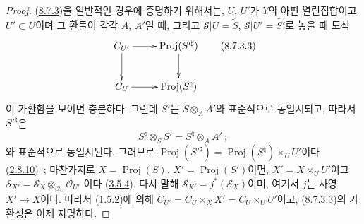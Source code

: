 \begin{proof}
(\hyperref[II.8.7.3-ko]{8.7.3})을 일반적인 경우에 증명하기 위해서는,
$U$, $U'$가 $Y$의 아핀 열린집합이고 $U'\subset U$이며 그 환들이 각각
$A$, $A'$일 때, 그리고
$\mathcal{S}|U=\widetilde{S}$, $\mathcal{S}|U'=\widetilde{S'}$로 놓을 때 도식
\begin{equation}
\label{II.8.7.3.3-ko}
  \xymatrix{
    C_{U'}\ar[r]\ar[d] & \operatorname{Proj}(S'^{\natural})\ar[d]\\
    C_U\ar[r] & \operatorname{Proj}(S^{\natural})
  }
\tag{8.7.3.3}
\end{equation}
이 가환함을 보이면 충분하다. 그런데 $S'$는 $S\otimes_A A'$와 표준적으로
동일시되고, 따라서 $S'^{\natural}$은
\[
  S^{\natural}\otimes_S S'=S^{\natural}\otimes_A A'~;
\]
와 표준적으로 동일시된다. 그러므로
$\operatorname{Proj}(S'^{\natural})=\operatorname{Proj}(S^{\natural})
\times_U U'$이다 (\hyperref[II.2.8.10-ko]{2.8.10})~; 마찬가지로
$X=\operatorname{Proj}(S)$, $X'=\operatorname{Proj}(S')$이면,
$X'=X\times_U U'$이고
$\mathcal{S}_{X'}=\mathcal{S}_X\otimes_{\mathcal{O}_U}\mathcal{O}_{U'}$
이다 (\hyperref[II.3.5.4-ko]{3.5.4}). 다시 말해
$\mathcal{S}_{X'}=j^*(\mathcal{S}_X)$이며, 여기서 $j$는 사영 $X'\to X$이다.
따라서 (\hyperref[II.1.5.2-ko]{1.5.2})에 의해
$C_{U'}=C_U\times_X X'=C_U\times_U U'$이고,
(\hyperref[II.8.7.3.3-ko]{8.7.3.3})의 가환성은 이제 자명하다.
\end{proof}


